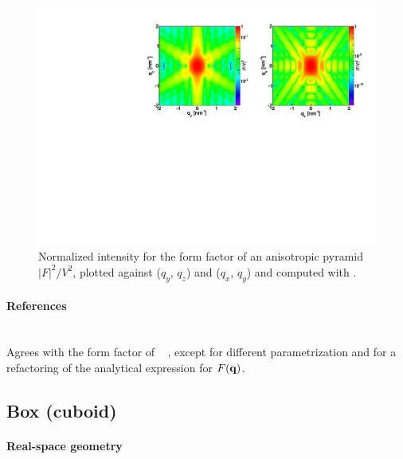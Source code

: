 \begin{figure}[H]
\begin{center}
\includegraphics[angle=-90,width=\textwidth]{fig/ff/figffanisopyramid.pdf}
\end{center}
\caption{Normalized intensity for the form factor of an anisotropic
  pyramid $|F|^2/V^2$, plotted against ($q_y$, $q_z$) and  ($q_x$, $q_y$) and computed with .}
\label{fig:FFAnisoPyramidEx}
\end{figure}

\paragraph{References}\strut\\
Agrees with the  form factor of \IsGISAXS\
\cite[Eq.~2.40]{Laz08} \cite[Eq.~217]{ReLL09},
except for different parametrization and
for a refactoring of the analytical expression for $F(\mathbf{q})$.

\FloatBarrier\newpage
\subsection{Box (cuboid)} \label{sec:Box}

\paragraph{Real-space geometry}\strut\\


